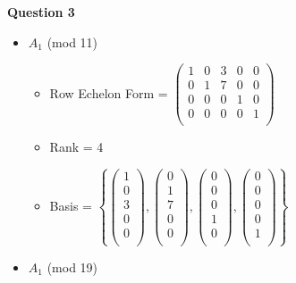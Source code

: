\documentclass[14pt]{extarticle}
\begin{document}
\begin{center}
\textbf{Question 3}
\end{center}
 
\begin{itemize}
\item $A_1$ (mod 11)
	\begin{itemize}
	\item Row Echelon Form = $\begin{pmatrix} 
  								1 &  0 &  3 &  0 &  0 \\ 
  								0 &  1 &  7 &  0 &  0 \\ 
  								0 &  0 &  0 &  1 &  0 \\ 
  								0 &  0 &  0 &  0 &  1 \\ 
							\end{pmatrix}$
	\item Rank = 4\\
	\item Basis = $\left \{
					\begin{pmatrix}  1 \\  0 \\  3 \\  0 \\  0 \\\end{pmatrix},  
					\begin{pmatrix}  0 \\  1 \\  7 \\  0 \\  0 \\\end{pmatrix},
					\begin{pmatrix}  0 \\  0 \\  0 \\  1 \\  0 \\\end{pmatrix},
					\begin{pmatrix}  0 \\  0 \\  0 \\  0 \\  1 \\\end{pmatrix} 
				  \right \}$\\
	\end{itemize}
\item $A_1$ (mod 19)
	\begin{itemize}

\end{itemize}
\end{itemize}
\end{document}
